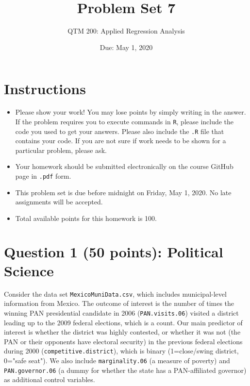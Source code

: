 \documentclass[12pt,letterpaper]{article}
\title{Problem Set 7}
\date{Due: May 1, 2020}
\author{QTM 200: Applied Regression Analysis}
\begin{document}
	\maketitle
	
	\section*{Instructions}
	\begin{itemize}
		\item Please show your work! You may lose points by simply writing in the answer. If the problem requires you to execute commands in \texttt{R}, please include the code you used to get your answers. Please also include the \texttt{.R} file that contains your code. If you are not sure if work needs to be shown for a particular problem, please ask.
		\item Your homework should be submitted electronically on the course GitHub page in \texttt{.pdf} form.
		\item This problem set is due before midnight on Friday, May 1, 2020. No late assignments will be accepted.
		\item Total available points for this homework is 100.
	\end{itemize}
	
	\vspace{.5cm}

\section*{Question 1 (50 points): Political Science}	
\noindent Consider the data set \texttt{MexicoMuniData.csv}, which includes municipal-level information from Mexico. The outcome of interest is the number of times the winning PAN presidential candidate in 2006 (\texttt{PAN.visits.06}) visited a district leading up to the 2009 federal elections, which is a count. Our main predictor of interest is whether the district was highly contested, or whether it was not (the PAN or their opponents have electoral security) in the previous federal elections during 2000 (\texttt{competitive.district}), which is binary (1=close/swing district, 0="safe seat"). We also include \texttt{marginality.06} (a measure of poverty) and \texttt{PAN.governor.06} (a dummy for whether the state has a PAN-affiliated governor) as additional control variables. 
\end{document}
